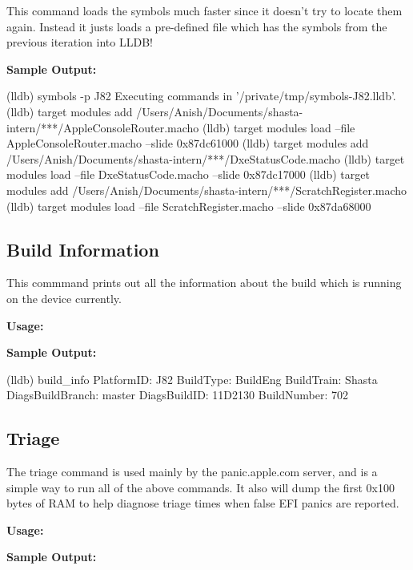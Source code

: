 This command loads the symbols much faster since it doesn't try to locate them again.
Instead it justs loads a pre-defined file which has the symbols from the previous iteration into LLDB!

\textcolor{SmokeyDarkBlue}{\bfseries Sample Output:} \\
\begin{TerminalOutput}
(lldb) symbols -p J82
Executing commands in '/private/tmp/symbols-J82.lldb'.
(lldb) target modules add /Users/Anish/Documents/shasta-intern/***/AppleConsoleRouter.macho
(lldb) target modules load --file AppleConsoleRouter.macho --slide 0x87dc61000
(lldb) target modules add /Users/Anish/Documents/shasta-intern/***/DxeStatusCode.macho
(lldb) target modules load --file DxeStatusCode.macho --slide 0x87dc17000
(lldb) target modules add /Users/Anish/Documents/shasta-intern/***/ScratchRegister.macho
(lldb) target modules load --file ScratchRegister.macho --slide 0x87da68000
\end{TerminalOutput}

\subsection{Build Information}

This commmand prints out all the information about the build which is 
running on the device currently.

\textcolor{SmokeyDarkBlue}{\bfseries Usage:} 

\textcolor{SmokeyDarkBlue}{\bfseries Sample Output:} \\

\begin{TerminalOutput}
(lldb) build_info
PlatformID: J82
BuildType: BuildEng
BuildTrain: Shasta
DiagsBuildBranch: master
DiagsBuildID: 11D2130
BuildNumber: 702
\end{TerminalOutput}

\subsection{Triage}

The triage command is used mainly by the panic.apple.com server, and is a simple way to run all
of the above commands. It also will dump the first 0x100 bytes of RAM to help diagnose triage
times when false EFI panics are reported.

\textcolor{SmokeyDarkBlue}{\bfseries Usage:} 

\textcolor{SmokeyDarkBlue}{\bfseries Sample Output:} \\

